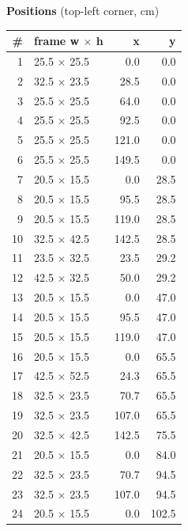\documentclass[a4paper,landscape,10pt]{article}
\begin{document}
\begin{minipage}[t]{0.25\textwidth}
\vspace{8pt}
{\bfseries Positions} (top-left corner, cm)\\[2pt]
\tiny
\begin{tabular}{@{}r l r r@{}}
\toprule
\# & frame w $\times$ h & x & y \\
\midrule
1 & 25.5 $\times$ 25.5 & 0.0 & 0.0 \\
2 & 32.5 $\times$ 23.5 & 28.5 & 0.0 \\
3 & 25.5 $\times$ 25.5 & 64.0 & 0.0 \\
4 & 25.5 $\times$ 25.5 & 92.5 & 0.0 \\
5 & 25.5 $\times$ 25.5 & 121.0 & 0.0 \\
6 & 25.5 $\times$ 25.5 & 149.5 & 0.0 \\
7 & 20.5 $\times$ 15.5 & 0.0 & 28.5 \\
8 & 20.5 $\times$ 15.5 & 95.5 & 28.5 \\
9 & 20.5 $\times$ 15.5 & 119.0 & 28.5 \\
10 & 32.5 $\times$ 42.5 & 142.5 & 28.5 \\
11 & 23.5 $\times$ 32.5 & 23.5 & 29.2 \\
12 & 42.5 $\times$ 32.5 & 50.0 & 29.2 \\
13 & 20.5 $\times$ 15.5 & 0.0 & 47.0 \\
14 & 20.5 $\times$ 15.5 & 95.5 & 47.0 \\
15 & 20.5 $\times$ 15.5 & 119.0 & 47.0 \\
16 & 20.5 $\times$ 15.5 & 0.0 & 65.5 \\
17 & 42.5 $\times$ 52.5 & 24.3 & 65.5 \\
18 & 32.5 $\times$ 23.5 & 70.7 & 65.5 \\
19 & 32.5 $\times$ 23.5 & 107.0 & 65.5 \\
20 & 32.5 $\times$ 42.5 & 142.5 & 75.5 \\
21 & 20.5 $\times$ 15.5 & 0.0 & 84.0 \\
22 & 32.5 $\times$ 23.5 & 70.7 & 94.5 \\
23 & 32.5 $\times$ 23.5 & 107.0 & 94.5 \\
24 & 20.5 $\times$ 15.5 & 0.0 & 102.5 \\
\bottomrule
\end{tabular}
\end{minipage}
\clearpage
\end{document}
